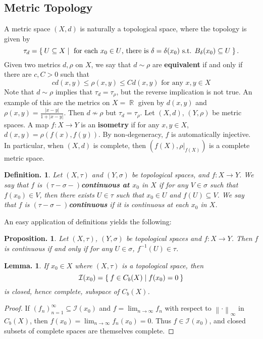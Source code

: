 \documentclass[11pt, a4paper]{memoir}
\DeclareMathOperator{\R}{{\mathbb{R}}}
\newcommand{\mbf}[1]{{\boldmath\bfseries #1}}
\newcommand{\norm}[1]{\ensuremath{\left\lVert#1\right\rVert}}
\theoremstyle{change}
\newtheorem{lemma}[theorem]{Lemma.}
\newtheorem{proposition}[theorem]{Proposition.}
\theoremstyle{plain}
\theoremstyle{nonumberplain}
\newtheorem{definition}{Definition.}
\newtheorem{proof}{Proof}
\DeclareMathOperator{\B}{{\mathcal{B}}}
\numberwithin{equation}{section}
\begin{document}
\subsection{Metric Topology}
A metric space $(X,d)$ is naturally a topological space, where the topology is given by
\begin{equation*}
    \tau_d = \Set{U\subseteq X |\text{ for each }x_0\in U\text{, there is }\delta=\delta(x_0)\text{ s.t. }\\B_\delta(x_0)\subseteq U}.
\end{equation*}
Given two metrics $d,\rho$ on $X$, we say that $d\sim\rho$ are \textbf{equivalent} if and only if there are $c,C>0$ such that
\begin{equation*}
    cd(x,y)\leq\rho(x,y)\leq Cd(x,y)\text{ for any }x,y\in X
\end{equation*}
Note that $d\sim\rho$ implies that $\tau_d=\tau_\rho$, but the reverse implication is not true.
An example of this are the metrics on $X=\R$ given by $d(x,y)$ and $\rho(x,y)=\frac{|x-y|}{1+|x-y|}$.
Then $d\not\sim\rho$ but $\tau_d=\tau_\rho$.
Let $(X,d)$, $(Y,\rho)$ be metric spaces.
A map $f:X\to Y$ is an \textbf{isometry} if for any $x,y\in X$, $d(x,y)=\rho(f(x),f(y))$.
By non-degeneracy, $f$ is automatically injective.
In particular, when $(X,d)$ is complete, then $(f(X),\rho|_{f(X)})$ is a complete metric space.
\begin{definition}
    Let $(X,\tau)$ and $(Y,\sigma)$ be topological spaces, and $f:X\to Y$.
    We say that $f$ is \mbf{$(\tau-\sigma-)$continuous at $x_0$} in $X$ if for any $V\in\sigma$ such that $f(x_0)\in V$, then there exists $U\in\tau$ such that $x_0\in U$ and $f(U)\subseteq V$.
    We say that $f$ is \mbf{$(\tau-\sigma-)$continuous} if it is continuous at each $x_0$ in $X$.
\end{definition}
An easy application of definitions yields the following:
\begin{proposition}
    Let $(X,\tau)$, $(Y,\sigma)$ be topological spaces and $f:X\to Y$.
    Then $f$ is continuous if and only if for any $U\in\sigma$, $f^{-1}(U)\in\tau$.
\end{proposition}
\begin{lemma}
    If $x_0\in X$ where $(X,\tau)$ is a topological space, then
    \begin{equation*}
        \mathcal{I}(x_0)= \Set{f\in C_b(X) | f(x_0)=0}
    \end{equation*}
    is closed, hence complete, subspace of $C_b(X)$.
\end{lemma}
\begin{proof}
    If $(f_n)_{n=1}^\infty\subseteq\mathcal{I}(x_0)$ and $f=\lim_{n\to\infty}f_n$ with respect to $\norm{\cdot}_\infty$ in $C_b(X)$, then $f(x_0)=\lim_{n\to\infty}f_n(x_0)=0$.
    Thus $f\in\mathcal{I}(x_0)$, and closed subsets of complete spaces are themselves complete.
\end{proof}
\end{document}
